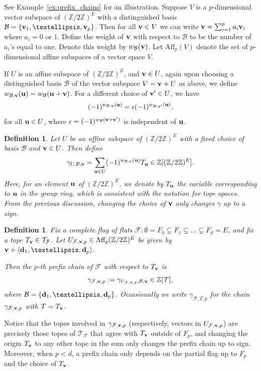 \documentclass{amsart}
\newtheorem{definition}[theorem]{Definition}
\newcommand\Bcal{{\mathcal B}}
\newcommand\Fcal{{\mathcal F}}
\newcommand\Tcal{{\mathcal T}}
\newcommand\dd{{\bf d}}
\newcommand\uu{{\bf u}}
\newcommand\vv{{\bf v}}
\newcommand\ZZ{{\mathbb Z}}
\newcommand\Ztwo{{\mathbb Z}/2{\mathbb Z}}
\begin{document}
{See Example~\ref{ex:prefix_chains} for an illustration.
Suppose $V$ is a $p$-dimensional vector subspace of $ (\Ztwo)^E$ with a distinguished basis $\Bcal = \{ {\bf v}_1, \dots, {\bf v}_p\}$. 
Then for all ${\bf v} \in V$ we can write 
${\bf v} = \sum_{i = 1}^p a_i{\bf v}_i$ where $a_i = 0$ or $ 1$. 
Define the weight of ${\bf v }$ with respect to $\Bcal$ to be the number of $a_i$'s equal to one. Denote this weight by $w_\Bcal({\bf v})$.
Let $\text{Aff}_p(V)$ denote the set of $p$-dimensional affine subspaces of a vector space $V$.

If $U$ is an affine subspace of $ (\Ztwo)^E$, and $\vv\in U$, again upon choosing a distinguished basis $\Bcal$
of the vector subspace $V =\vv + U $ as above, we define $w_{\Bcal, \vv} (\uu) = w_\Bcal(\uu+ \vv)$. 
For a different choice of $\vv' \in U$, we have \[(-1)^{w_{\Bcal, \vv}(\uu)} = \epsilon (-1)^{w_{\Bcal, \vv'}(\uu)},\] for all $ \uu\in U$, where $\epsilon=(-1)^{w_\Bcal(\vv+\vv')}$ is independent of $\uu$.

\begin{definition} \label{def:prefix_chain}
Let $U$ be an affine subspace of $(\ZZ/2\ZZ)^E$ with a fixed choice of basis $\Bcal$ and $\vv\in U$.
Then define 
$$\gamma_{U, \Bcal, \vv} = \sum_{\uu\in U} (-1)^{w_{\Bcal, \vv}(\uu)} T_\uu\in\ZZ[(\ZZ/2\ZZ)^E].$$
Here, for an element $\uu$ of $(\ZZ/2\ZZ)^E$, we denote by $T_\uu$ the variable corresponding to $\uu$ in the group ring, which is consistent with the notation for tope spaces.
From the previous discussion, changing the choice of $\vv$ only changes $\gamma$ up to a sign.
\end{definition}

\begin{definition}\label{def:prefixchains}
Fix a complete flag of flats $\Fcal:\emptyset=F_0 \subsetneq  F_1 \subsetneq \ldots \subsetneq  F_d=E$, and fix a tope $T_{\vv}\in\Tcal_\Fcal$.
Let $U_{\Fcal,\vv,p} \in \text{Aff}_p (\ZZ/2\ZZ)^E$ be given by $\vv + \langle \dd_1, \ldots, \dd_p\rangle$. 

Then the {\em $p$-th prefix chain} of $\Fcal$ with respect to $T_{\vv}$ is $$\gamma_{\Fcal ,\vv, p} :=
\gamma_{U_{\Fcal,\vv,p},\Bcal, \vv}\in\ZZ[\Tcal],$$
where $\Bcal = \{\dd_1, \ldots, \dd_p\}$.
Occasionally we write $\gamma_{\Fcal,T,p}$ for the chain $\gamma_{\Fcal,\vv,p}$ with $T=T_{\vv}$.
\end{definition}

Notice that the topes involved in $\gamma_{\Fcal,\vv,p}$ (respectively, vectors in $U_{\Fcal,\vv,p}$) are precisely those topes of $\Tcal_\Fcal$ that agree with $T_{\vv}$ outside of $F_p$, and changing the origin $T_{\vv}$ to any other tope in the sum only changes the prefix chain up to sign.
Moreover, when $p<d$, a prefix chain only depends on the partial flag up to $F_p$ and the choice of $T_{\vv}$.

}
\end{document}
